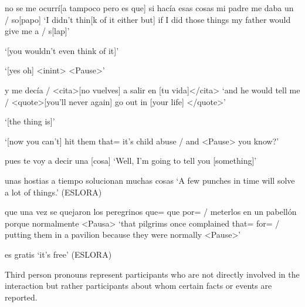 \documentclass[output=paper]{langscibook}
\begin{document}
\ea\label{ex:pierre:2}
\begin{xlist}[Speaker 2]
 no se me ocurrí[a tampoco pero es que] si hacía esas cosas mi padre me daba un / so[papo]
 ‘I didn't thin[k of it either but] if I did those things my father would give me a / s[lap]’

 ‘[you wouldn't even think of it]’~

 ‘[yes oh] <inint> <Pause>’

 y me decía / <cita>[no vuelves] a salir en [tu vida]</cita>
 ‘and he would tell me / <quote>[you'll never again] go out in [your life] </quote>’

 ‘[the thing is]’

 ‘[now you can't] hit them that= it's child abuse / and     <Pause> you know?’

 pues te voy a decir una [cosa]
 ‘Well, I'm going to tell you [something]’~~


 unas hostias a tiempo solucionan muchas cosas
 ‘A few punches in time will solve a lot of things.’ (ESLORA)
\end{xlist}
\ex\label{ex:pierre:3}
\begin{xlist}[Speaker 2]
 que una vez se quejaron los peregrinos que= que  por= / meterlos en un pabellón porque normalmente <Pausa>
 ‘that pilgrims once complained that=       for= / putting them in   a pavilion because they were normally <Pause>’

 es gratis
 ‘it’s free’ (ESLORA)
\end{xlist}
\z 

Third person pronouns represent participants who are not directly involved in the interaction but rather participants about whom certain facts or events are reported.
\end{document}
